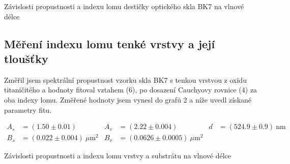 \documentclass[a4paper,11pt]{article}
\begin{document}
\vspace{-10pt}

\begin{table}[htpb]
    \begin{minipage}[b]{.5\linewidth}
        \centering
        \resizebox{\textwidth}{!}{  }
    \end{minipage} 
    \hfill
    \begin{minipage}[b]{.5\linewidth}
        \centering
        \resizebox{\textwidth}{!}{  }
    \end{minipage} 
    \captionsetup{type=graph}
    \caption{Závislosti propustnosti a indexu lomu destičky optického skla BK7 na vlnové délce}
\end{table}

\subsection{Měření indexu lomu tenké vrstvy a její tloušťky}

Změřil jsem spektrální propustnost vzorku skla BK7 s tenkou vrstvou z oxidu titaničitého a hodnoty fitoval vztahem (6), po dosazení Cauchyovy rovnice (4) za oba indexy lomu. Změřené hodnoty jsem vynesl do grafů 2 a níže uvedl získané parametry fitu.

\vspace{-5pt}

\begin{align*}
    A_s &= (1.50 \pm 0.01) & A_v &= (2.22 \pm 0.004) & d  &= (524.9 \pm 0.9) \ \text{nm}\\
    B_s &= (0.022 \pm 0.004)  \ \mu \text{m} ^2  & B_v &= (0.0626 \pm 0.0005) \ \mu \text{m} ^2
\end{align*}

\vspace{-10pt}

\begin{table}[htpb]
    \begin{minipage}[b]{.625\linewidth}
        \centering
        \resizebox{\textwidth}{!}{  }
    \end{minipage} 
    \hfill
    \begin{minipage}[b]{.375\linewidth}
        \centering
        \resizebox{\textwidth}{!}{  }
    \end{minipage} 
    \captionsetup{type=graph}
    \caption{Závislosti propustnosti a indexu lomu vrstvy a substrátu na vlnové délce}
    \vspace{-30pt}
\end{table}
\end{document}
